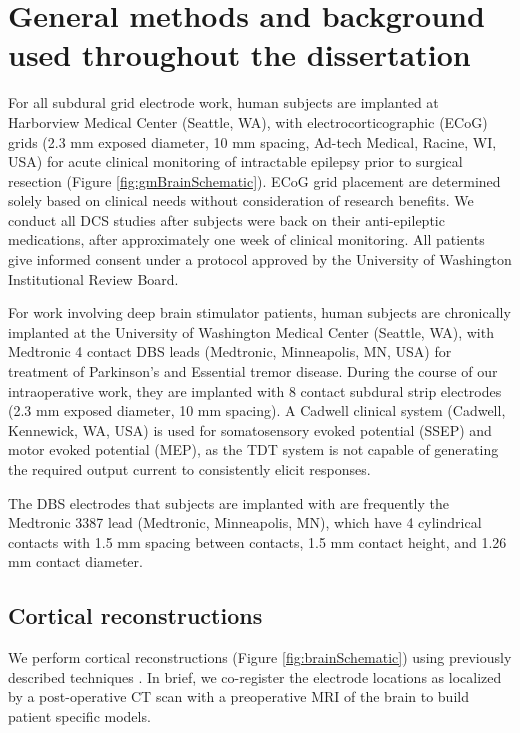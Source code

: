 
 
 
\chapter {General methods and background used throughout the dissertation} \label{chap:generalMethods}

For all subdural grid electrode work, human subjects are implanted at Harborview Medical Center (Seattle, WA), with electrocorticographic (ECoG) grids (2.3 mm exposed diameter, 10 mm spacing, Ad-tech Medical, Racine, WI, USA) for acute clinical monitoring of intractable epilepsy prior to surgical resection (Figure \ref{fig:gmBrainSchematic}). ECoG grid placement are determined solely based on clinical needs without consideration of research benefits. We conduct all DCS studies after subjects were back on their anti-epileptic medications, after approximately one week of clinical monitoring. All patients give informed consent under a protocol approved by the University of Washington Institutional Review Board.

For work involving deep brain stimulator patients, human subjects are chronically implanted at the University of Washington Medical Center (Seattle, WA), with Medtronic 4 contact DBS leads (Medtronic, Minneapolis, MN, USA) for treatment of Parkinson’s and Essential tremor disease. During the course of our intraoperative work, they are implanted with 8 contact subdural strip electrodes (2.3 mm exposed diameter, 10 mm spacing). A Cadwell clinical system (Cadwell, Kennewick, WA, USA) is used for somatosensory evoked potential (SSEP) and motor evoked potential (MEP), as the TDT system is not capable of generating the required output current to consistently elicit responses. 

The DBS electrodes that subjects are implanted with are frequently the Medtronic 3387 lead (Medtronic, Minneapolis, MN), which have 4 cylindrical contacts with 1.5 mm spacing between contacts, 1.5 mm contact height, and 1.26 mm contact diameter. 


\section{Cortical reconstructions}

We perform cortical reconstructions (Figure \ref{fig:brainSchematic}) using previously described techniques \cite{Blakely2009,Hermes2010a,Wander2016}. In brief, we co-register the electrode locations as localized by a post-operative CT scan with a preoperative MRI of the brain to build patient specific models. 

